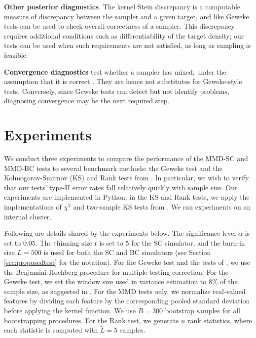 \documentclass{article}
\begin{document}
{\noindent\bf Other posterior diagnostics}.
The kernel Stein discrepancy \citep{Chwialkowski2016, Gorham2017, liu_kernelized_2016} is a computable measure of discrepancy between the sampler and a given target, and like Geweke tests can be used to check overall correctness of a sampler. 
This discrepancy requires additional conditions such as differentiability of the target density; our tests can be used when such requirements are not satisfied, as long as sampling is feasible.

{\noindent\bf Convergence diagnostics} test whether a sampler has mixed, under the assumption that it is correct \citep[e.g.][]{robert_short_2011}. They are hence not substitutes for Geweke-style tests. Conversely, since Geweke tests can detect but not identify problems, diagnosing convergence may be the next required step. 


\section{Experiments}\label{sec:experiments}
We conduct three experiments to compare the performance of the MMD-SC and MMD-BC tests to several benchmark methods: the Geweke test and the Kolmogorov-Smirnov (KS) and Rank tests from \cite{gandy_unit_2020}. 
In particular, we wish to verify that our tests' type-II error rates fall relatively quickly with sample size. 
Our experiments are implemented in Python; in the KS and Rank tests, we apply the implementations of $\chi^{2}$ and two-sample KS tests from \cite{2020SciPy-NMeth}.
We ran experiments on an internal cluster.

Following are details shared by the experiments below.
The significance level $\alpha$ is set to $0.05.$
The thinning size $t$ is set to $5$ for the SC simulator, and the burn-in size $L=500$ is used for both the SC and BC simulators (see Section \ref{sec:proposedtest} for the notation). 
For the Geweke test and the tests of \cite{gandy_unit_2020}, 
we use the Benjamini-Hochberg procedure \citep{benjamini_controlling_1995} for multiple testing correction. 
For the Geweke test, we set the window size used in variance estimation to $8\%$ of the sample size, as suggested in \cite{geweke_using_1999}.
For the MMD tests only,
we normalize real-valued features by dividing each feature by the corresponding pooled standard deviation before applying the kernel function. We use $B=300$ bootstrap samples for all bootstrapping procedures. 
For the Rank test, we generate $n$ rank statistics, where each statistic is computed with $\tilde{L}=5$ samples.
\end{document}
